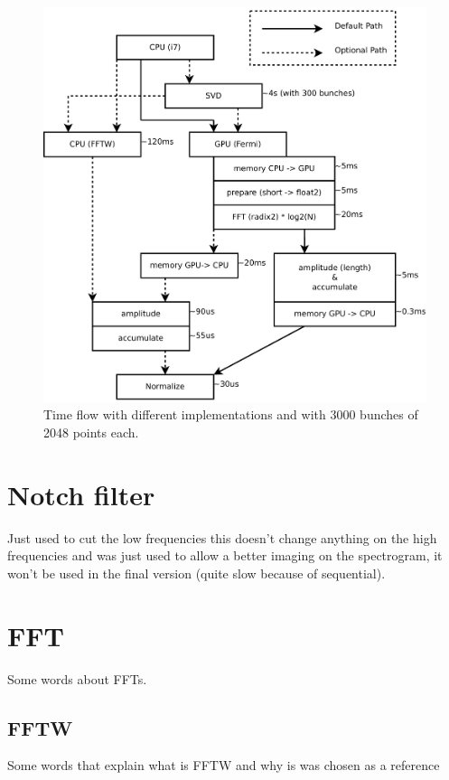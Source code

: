 	\begin{figure}[H]
	\caption{Time flow with different implementations and with 3000 bunches of 
	2048 points each.}
	\centering
	\includegraphics[scale=0.3]{PC-flow.pdf}
	\end{figure}

\section{Notch filter}

Just used to cut the low frequencies this doesn't change anything on the high frequencies and was just used to allow a better imaging on the spectrogram, it won't be used in the final version (quite slow because of sequential).

\section{FFT}

Some words about FFTs.

   \subsection{FFTW}

   Some words that explain what is FFTW and why is was chosen as a reference

